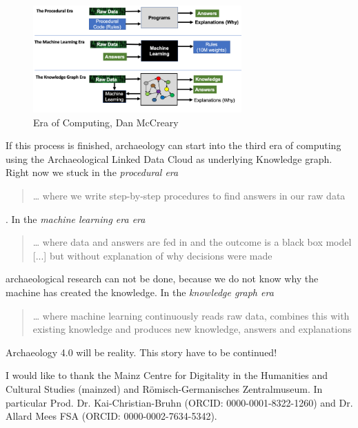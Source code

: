\documentclass[twocolumn]{autart}
\begin{document}
\begin{figure}[!htb]
\begin{center}
\includegraphics[width=8cm]{1_78b9DR1EApGRAst5FkPrwQ.png}   
\caption{Era of Computing, Dan McCreary \cite{mccreary_computing}} 
\label{figeoco}                                
\end{center}                               
\end{figure}

If this process is finished, archaeology can start into the third era of computing \cite{hey_computing} using the Archaeological Linked Data Cloud as underlying Knowledge graph. Right now we stuck in the \textit{procedural era} \begin{quotation}… where we write step-by-step procedures to find answers in our raw data\cite{mccreary_computing}\end{quotation}. In the \textit{machine learning era era} \begin{quotation}… where data and answers are fed in and the outcome is a black box model [...] but without explanation of why decisions were made\cite{mccreary_computing}\end{quotation} archaeological research can not be done, because we do not know why the machine has created the knowledge. In the \textit{knowledge graph era} \begin{quotation}… where machine learning continuously reads raw
data, combines this with existing knowledge and produces new knowledge, answers and explanations\cite{mccreary_computing}\end{quotation} Archaeology 4.0 will be reality. This story have to be continued!

\begin{ack}                               
I would like to thank the Mainz Centre for Digitality in the Humanities and Cultural Studies (mainzed) and R\"omisch-Germanisches Zentralmuseum. In particular Prod. Dr. Kai-Christian-Bruhn (ORCID: 0000-0001-8322-1260) and Dr. Allard Mees FSA (ORCID: 0000-0002-7634-5342).
\end{ack}

\end{document}

